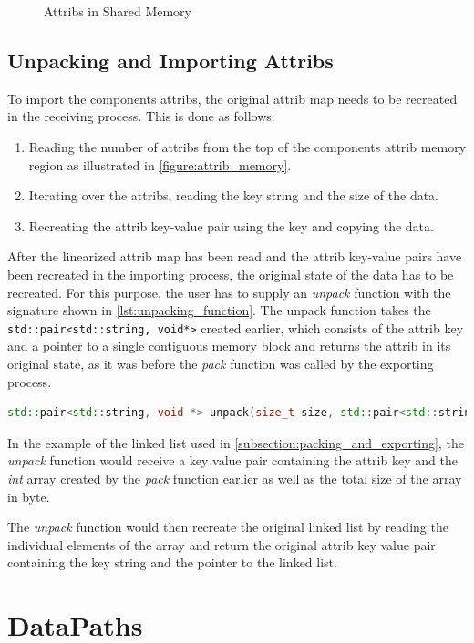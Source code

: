 \begin{figure}[!ht]
    \centering
    \caption{Attribs in Shared Memory}
    \label{figure:attrib_memory}
\end{figure}

\subsection{Unpacking and Importing Attribs}
To import the components attribs, the original attrib map needs to be recreated in the receiving process. This is done as follows:

\begin{enumerate}
    \item Reading the number of attribs from the top of the components attrib memory region as illustrated in \autoref{figure:attrib_memory}.
    \item Iterating over the attribs, reading the key string and the size of the data.
    \item Recreating the attrib key-value pair using the key and copying the data.
\end{enumerate}

After the linearized attrib map has been read and the attrib key-value pairs have been recreated in the importing process, the original state of the data has to be recreated.
For this purpose, the user has to supply an \emph{unpack} function with the signature shown in \autoref{lst:unpacking_function}.
The unpack function takes the \lstinline|std::pair<std::string, void*>| created earlier, which consists of the attrib key and a pointer to a single contiguous memory block
and returns the attrib in its original state, as it was before the \emph{pack} function was called by the exporting process.

\begin{lstlisting}[language=c++, numbers=none, caption=Unpack Function Declaration, captionpos=b, breaklines=true, label={lst:unpacking_function}]
    std::pair<std::string, void *> unpack(size_t size, std::pair<std::string, void *> attrib);
\end{lstlisting}

In the example of the linked list used in \autoref{subsection:packing_and_exporting}, the \emph{unpack} function would receive a key value pair containing the attrib key
and the \emph{int} array created by the \emph{pack} function earlier as well as the total size of the array in byte.

The \emph{unpack} function would then recreate the original linked list by reading the individual elements of the array and return the original attrib key value pair containing
the key string and the pointer to the linked list.

\section{DataPaths}
